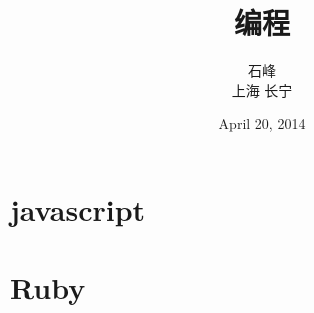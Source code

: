 \documentclass[12pt, oneside, b5paper]{book}
\title{编程}
\author{石峰\\
			上海 长宁}
\date{April 20, 2014}
\begin{document}
  
\begin{CJK}{UTF8}{gkai}
\maketitle

\part{javascript}






\part{Ruby}  

		
\newpage
\end{CJK}  
\end{document}
